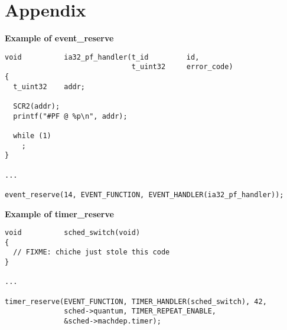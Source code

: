 %
%

\newpage

\section{Appendix}

\textbf{Example of event\_reserve}

\begin{verbatim}
void          ia32_pf_handler(t_id         id,
                              t_uint32     error_code)
{
  t_uint32    addr;

  SCR2(addr);
  printf("#PF @ %p\n", addr);

  while (1)
    ;
}

...

event_reserve(14, EVENT_FUNCTION, EVENT_HANDLER(ia32_pf_handler));
\end{verbatim}

\textbf{Example of timer\_reserve}

\begin{verbatim}
void          sched_switch(void)
{
  // FIXME: chiche just stole this code
}

...

timer_reserve(EVENT_FUNCTION, TIMER_HANDLER(sched_switch), 42,
              sched->quantum, TIMER_REPEAT_ENABLE,
              &sched->machdep.timer);
\end{verbatim}
